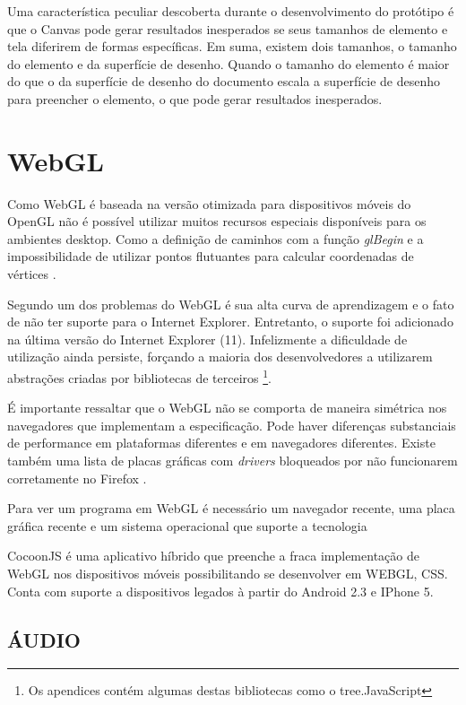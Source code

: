 Uma característica peculiar descoberta durante o desenvolvimento
do protótipo é que o Canvas pode gerar resultados inesperados se
seus tamanhos de elemento e tela diferirem de formas específicas. Em
suma, existem dois tamanhos, o tamanho do elemento e da superfície de
desenho. Quando o tamanho do elemento é maior do que o da superfície
de desenho do documento escala a superfície de desenho para preencher o
elemento, o que pode gerar resultados inesperados.

\section{WebGL}

Como WebGL é baseada na versão otimizada para dispositivos móveis do
OpenGL não é possível utilizar muitos recursos especiais disponíveis
para os ambientes desktop. Como a definição de caminhos com a função
\textit{glBegin} e a impossibilidade de utilizar pontos flutuantes para
calcular coordenadas de vértices \autocite{esVsGl}.

Segundo \cite{html5mostwanted} um dos problemas do WebGL é sua alta
curva de aprendizagem e o fato de não ter suporte para o Internet
Explorer. Entretanto, o suporte foi adicionado na última versão do
Internet Explorer (11). Infelizmente a dificuldade de utilização
ainda persiste, forçando a maioria dos desenvolvedores a utilizarem
abstrações criadas por bibliotecas de terceiros \footnote{Os apendices
contém algumas destas bibliotecas como o tree.JavaScript}.

É importante ressaltar que o WebGL não se comporta de maneira
simétrica nos navegadores que implementam a especificação. Pode haver
diferenças substanciais de performance em plataformas diferentes e em
navegadores diferentes. Existe também uma lista de placas gráficas com
\textit{drivers} bloqueados por não funcionarem corretamente no Firefox
\autocite[pp.42]{3daps}.

Para ver um programa em WebGL é necessário um navegador recente, uma
placa gráfica recente e um sistema operacional que suporte a tecnologia
\autocite{html5mostwanted}

CocoonJS é uma aplicativo híbrido que preenche a fraca implementação
de WebGL nos dispositivos móveis possibilitando se desenvolver em
WEBGL, CSS. Conta com suporte a dispositivos legados à partir do
Android 2.3 e IPhone 5.

\subsection{ÁUDIO}

